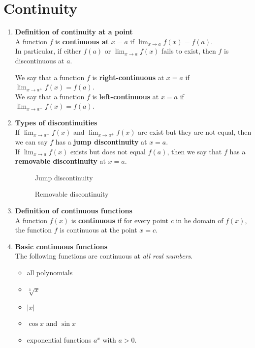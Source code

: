 \section{Continuity}
\begin{enumerate}
    \item \textbf{Definition of continuity at a point}\\
        \indent A function \(f\) is \textbf{continuous at} \(x=a\) if \(\lim_{x\to a}f(x)=f(a)\).\\
        \indent In particular, if either \(f(a)\) or \(\lim_{x\to a} f(x)\) fails to exist, then \(f\) is discontinuous at \(a\).\par
        \indent We say that a function \(f\) is \textbf{right-continuous} at \(x=a\) if \(\lim_{x\to a^+}f(x)=f(a)\).\\
        \indent We say that a function \(f\) is \textbf{left-continuous} at \(x=a\) if \(\lim_{x\to a^-}f(x)=f(a)\).
    \item \textbf{Types of discontinuities}\\
        \indent If \(\lim_{x\to a^-}f(x)\) and \(\lim_{x\to a^+}f(x)\) are exist but they are not equal, then we can say \(f\) has a \textbf{jump discontinuity} at \(x=a\).\\
        \indent If \(\lim_{x\to a}f(x)\) exists but does not equal \(f(a)\), then we say that \(f\) has a \textbf{removable discontinuity} at \(x=a\).
        \begin{figure}[H]
            \centering
            \caption{Jump discontinuity}
        \end{figure}
		\begin{figure}[H]
			\centering
			\caption{Removable discontinuity}
		\end{figure}
    \item \textbf{Definition of continuous functions}\\
       \indent A function \(f(x)\) is \textbf{continuous} if for every point \(c\) in he domain of \(f(x)\), the function \(f\) is continuous at the point \(x=c\).
   \item \textbf{Basic continuous functions}\\
        \indent The following functions are continuous at \textit{all real numbers}.
        \begin{itemize}
            \item all polynomials
            \item \(\sqrt[3]{x}\) 
            \item \(\lvert x\rvert\)
            \item \(\cos x\) and \(\sin x\)
            \item exponential functions \(a^x\) with \(a>0\).
        \end{itemize}


\end{enumerate}

